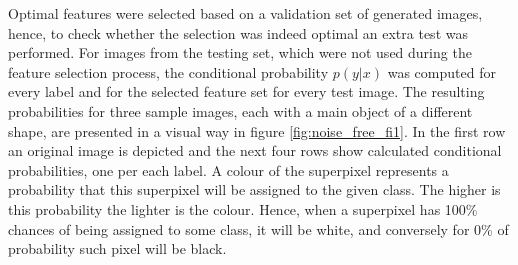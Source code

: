 Optimal features were selected based on a validation set of generated images, hence, to check whether the selection was indeed optimal an extra test was performed. For images from the testing set, which were not used during the feature selection process, the conditional probability $p(y|x)$ was computed for every label and for the selected feature set for every test image. The resulting probabilities for three sample images, each with a main object of a different shape, are presented in a visual way in figure \ref{fig:noise_free_fi1}. In the first row an original image is depicted and the next four rows show calculated conditional probabilities, one per each label. A colour of the superpixel represents a probability that this superpixel will be assigned to the given class. The higher is this probability the lighter is the colour. Hence, when a superpixel has 100\% chances of being assigned to some class, it will be white, and conversely for 0\% of probability such pixel will be black. 
